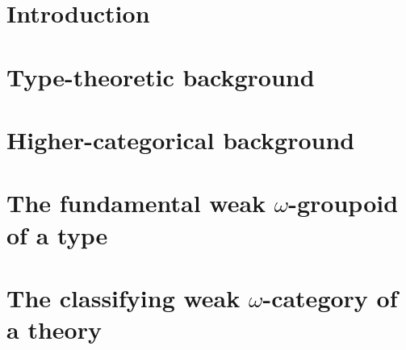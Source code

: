 \documentclass[11pt]{amsbook}
\begin{document}
%
%


\chapter*{Introduction}




\mainmatter

\chapter{Type-theoretic background}



\chapter{Higher-categorical background}
\label{ch:cat-background}



\chapter{The fundamental weak \texorpdfstring{$\omega$}{ω}-groupoid of a type} \label{ch:fundamental}



\chapter{The classifying weak \texorpdfstring{$\omega$}{ω}-category of a theory} \label{ch:classifying}






















\backmatter




\end{document}
